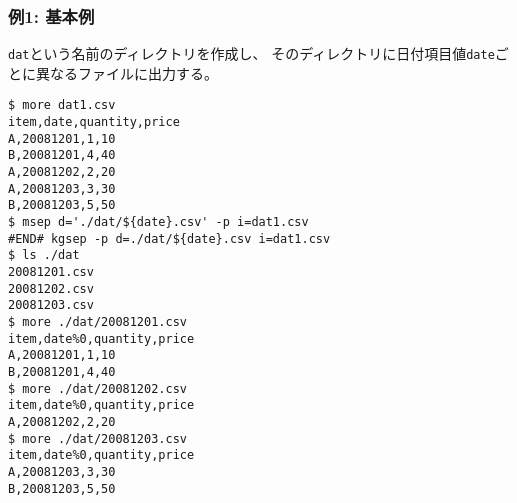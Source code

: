 \subsubsection*{例1: 基本例}

\verb|dat|という名前のディレクトリを作成し、
そのディレクトリに日付項目値\verb|date|ごとに異なるファイルに出力する。


\begin{Verbatim}[baselinestretch=0.7,frame=single]
$ more dat1.csv
item,date,quantity,price
A,20081201,1,10
B,20081201,4,40
A,20081202,2,20
A,20081203,3,30
B,20081203,5,50
$ msep d='./dat/${date}.csv' -p i=dat1.csv
#END# kgsep -p d=./dat/${date}.csv i=dat1.csv
$ ls ./dat
20081201.csv
20081202.csv
20081203.csv
$ more ./dat/20081201.csv
item,date%0,quantity,price
A,20081201,1,10
B,20081201,4,40
$ more ./dat/20081202.csv
item,date%0,quantity,price
A,20081202,2,20
$ more ./dat/20081203.csv
item,date%0,quantity,price
A,20081203,3,30
B,20081203,5,50
\end{Verbatim}
